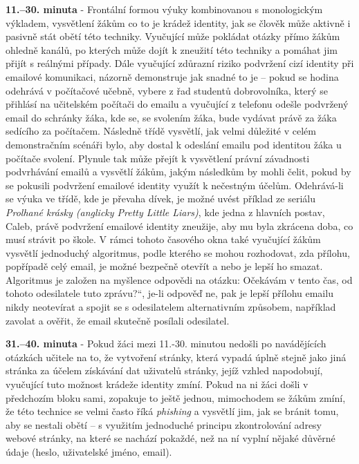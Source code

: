 \documentclass[a4paper, 12pt]{article}
\providecommand{\uv}[1]{\quotedblbase #1\textquotedblleft}
\begin{document}
\textbf{11.--30. minuta} - Frontální formou výuky kombinovanou s monologickým výkladem, vysvětlení žákům co to je krádež identity, jak se člověk může aktivně i pasivně stát obětí této techniky. Vyučující může pokládat otázky přímo žákům ohledně kanálů, po kterých může dojít k zneužití této techniky a pomáhat jim přijít s reálnými případy. Dále vyučující zdůrazní riziko podvržení cizí identity při emailové komunikaci, názorně demonstruje jak snadné to je -- pokud se hodina odehrává v počítačové učebně, vybere z řad studentů dobrovolníka, který se přihlásí na učitelském počítači do emailu a vyučující z telefonu odešle podvržený email do schránky žáka, kde se, se svolením žáka, bude vydávat právě za žáka sedícího za počítačem. Následně třídě vysvětlí, jak velmi důležité v celém demonstračním scénáři bylo, aby dostal k odeslání emailu pod identitou žáka u počítače svolení. Plynule tak může přejít k vysvětlení právní závadnosti podvrhávání emailů a vysvětlí žákům, jakým následkům by mohli čelit, pokud by se pokusili podvržení emailové identity využít k nečestným účelům. Odehrává-li se výuka ve třídě, kde je převaha dívek, je možné uvést příklad ze seriálu \textit{Prolhané krásky (anglicky Pretty Little Liars)}, kde jedna z hlavních postav, Caleb, právě podvržení emailové identity zneužije, aby mu byla zkrácena doba, co musí strávit po škole. V rámci tohoto časového okna také vyučující žákům vysvětlí jednoduchý algoritmus, podle kterého se mohou rozhodovat, zda přílohu, popřípadě celý email, je možné bezpečně otevřít a nebo je lepší ho smazat. Algoritmus je založen na myšlence odpovědi na otázku: \uv{Očekávám v tento čas, od tohoto odesilatele tuto zprávu?}, je-li odpověď ne, pak je lepší přílohu emailu nikdy neotevírat a spojit se s odesilatelem alternativním způsobem, například zavolat a ověřit, že email skutečně posílali odesilatel.

\textbf{31.--40. minuta} - Pokud žáci mezi 11.-30. minutou nedošli po navádějících otázkách učitele na to, že vytvoření stránky, která vypadá úplně stejně jako jiná stránka za účelem získávání dat uživatelů stránky, jejíž vzhled napodobují, vyučující tuto možnost krádeže identity zmíní. Pokud na ni žáci došli v předchozím bloku sami, zopakuje to ještě jednou, mimochodem se žákům zmíní, že této technice se velmi často říká \textit{phishing} a vysvětlí jim, jak se bránit tomu, aby se nestali obětí -- s využitím jednoduché principu zkontrolování adresy webové stránky, na které se nachází pokaždé, než na ní vyplní nějaké důvěrné údaje (heslo, uživatelské jméno, email).
\end{document}
